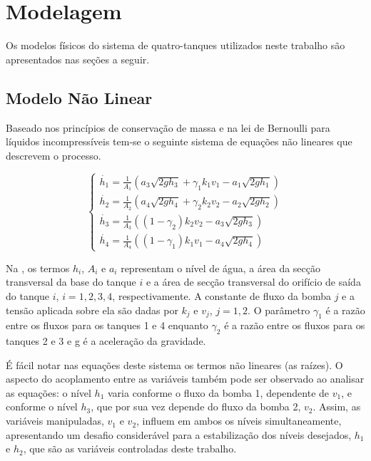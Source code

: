 %

\chapter{Modelagem}
\label{capMod}
Os modelos físicos do sistema de quatro-tanques utilizados neste trabalho são apresentados nas seções a seguir.

\section{Modelo Não Linear}
Baseado nos princípios de conservação de massa e na lei de Bernoulli para líquidos incompressíveis tem-se o seguinte sistema de equações não lineares que descrevem o processo.

\begin{equation}
	\begin{cases}
		\dot{h_{1}} = \frac{1}{A_{1}}(a_{3}\sqrt{2gh_{3}} + \gamma_{1}k_{1}v_{1} - a_{1}\sqrt{2gh_{1}})\\
		
		\dot{h_{2}} = \frac{1}{A_{2}}(a_{4}\sqrt{2gh_{4}} + \gamma_{2}k_{2}v_{2} - a_{2}\sqrt{2gh_{2}})\\
		
		\dot{h_{3}} = \frac{1}{A_{3}}((1 - \gamma_{2})k_{2}v_{2} - a_{3}\sqrt{2gh_{3}})\\
		
		\dot{h_{4}} = \frac{1}{A_{4}}((1 - \gamma_{1})k_{1}v_{1} - a_{4}\sqrt{2gh_{4}})
	\end{cases}
	\label{eqModNL}
\end{equation}

Na , os termos $h_{i}$, $A_{i}$ e $a_{i}$ representam o nível de água, a área da secção transversal da base do tanque $i$ e a área de secção transversal do orifício de saída do tanque $i$, $i=1,2,3,4$, respectivamente. A constante de fluxo da bomba $j$ e a tensão aplicada sobre ela são dadas por $k_{j}$ e $v_{j}$, $j=1,2$. O parâmetro $\gamma_{1}$ é a razão entre os fluxos para os tanques 1 e 4 enquanto $\gamma_{2}$ é a razão entre os fluxos para os tanques 2 e 3 e g é a aceleração da gravidade. 

É fácil notar nas equações deste sistema os termos não lineares (as raízes). O aspecto do acoplamento entre as variáveis também pode ser observado ao analisar as equações: o nível $h_1$ varia conforme o fluxo da bomba 1, dependente de $v_1$, e conforme o nível $h_3$, que por sua vez depende do fluxo da bomba 2, $v_2$. Assim, as variáveis manipuladas, $v_1$ e $v_2$, influem em ambos os níveis simultaneamente, apresentando um desafio considerável para a estabilização dos níveis desejados, $h_1$ e $h_2$, que são as variáveis controladas deste trabalho.

